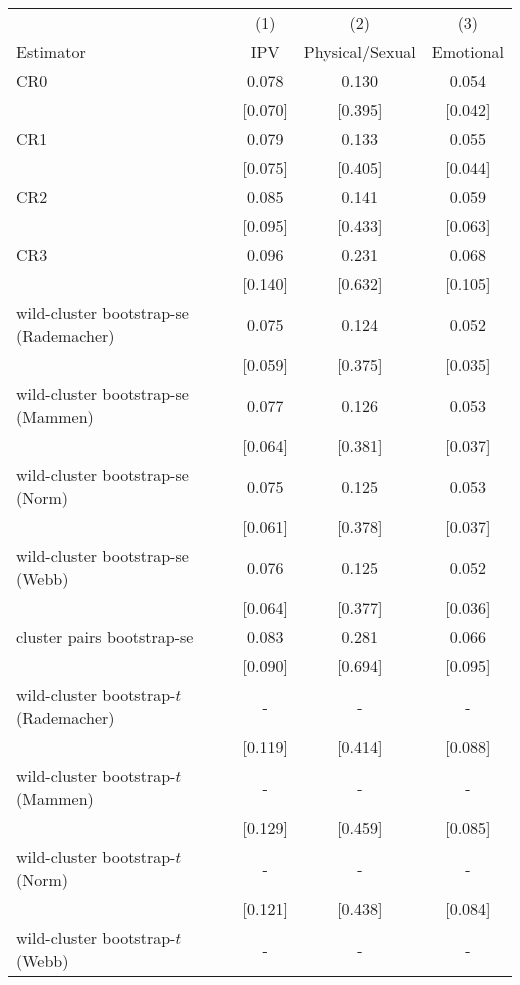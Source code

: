 \begin{table}[H]
\centering
\begin{threeparttable}
\begin{tabular}{lccc}
\toprule
\multicolumn{1}{c}{ } & \multicolumn{1}{c}{(1)} & \multicolumn{1}{c}{(2)} & \multicolumn{1}{c}{(3)} \\
Estimator & IPV & Physical/Sexual & Emotional\\
\midrule
CR0 & 0.078 & 0.130 & 0.054\\
 & [0.070] & [0.395] & [0.042]\\
\addlinespace
CR1 & 0.079 & 0.133 & 0.055\\
 & [0.075] & [0.405] & [0.044]\\
\addlinespace
CR2 & 0.085 & 0.141 & 0.059\\
 & [0.095] & [0.433] & [0.063]\\
\addlinespace
CR3 & 0.096 & 0.231 & 0.068\\
 & [0.140] & [0.632] & [0.105]\\
\addlinespace
wild-cluster bootstrap-se (Rademacher) & 0.075 & 0.124 & 0.052\\
 & [0.059] & [0.375] & [0.035]\\
\addlinespace
wild-cluster bootstrap-se (Mammen) & 0.077 & 0.126 & 0.053\\
 & [0.064] & [0.381] & [0.037]\\
\addlinespace
wild-cluster bootstrap-se (Norm) & 0.075 & 0.125 & 0.053\\
 & [0.061] & [0.378] & [0.037]\\
\addlinespace
wild-cluster bootstrap-se (Webb) & 0.076 & 0.125 & 0.052\\
 & [0.064] & [0.377] & [0.036]\\
\addlinespace
cluster pairs bootstrap-se & 0.083 & 0.281 & 0.066\\
 & [0.090] & [0.694] & [0.095]\\
\addlinespace
wild-cluster bootstrap-$t$ (Rademacher) & - & - & -\\
 & [0.119] & [0.414] & [0.088]\\
\addlinespace
wild-cluster bootstrap-$t$ (Mammen) & - & - & -\\
 & [0.129] & [0.459] & [0.085]\\
\addlinespace
wild-cluster bootstrap-$t$ (Norm) & - & - & -\\
 & [0.121] & [0.438] & [0.084]\\
\addlinespace
wild-cluster bootstrap-$t$ (Webb) & - & - & -\\

\end{tabular}
\end{threeparttable}
\end{table}
